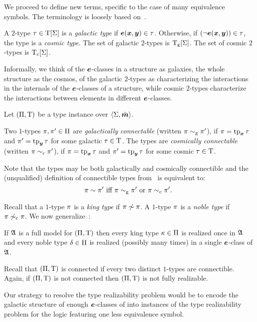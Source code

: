 We proceed to define new terms, specific to the case of many equivalence
symbols.
The terminology is loosely based on~\cite{MALQ:MALQ201400102}.

\begin{definition}
A $2$-type $\tau \in \mathrm{T}[\mathrm{\Sigma}]$ is a \emph{galactic type} if $\bm{e}(\bm{x},\bm{y}) \in
\tau$.
Otherwise, if $(\lnot\bm{e}(\bm{x},\bm{y})) \in \tau$, the type is a \emph{cosmic type}.
The set of galactic $2$-types is $\mathrm{T}_{\mathrm{g}}[\mathrm{\Sigma}]$.
The set of cosmic $2$-types is $\mathrm{T}_{\mathrm{c}}[\mathrm{\Sigma}]$.
\end{definition}
Informally, we think of the $\bm{e}$-classes in a structure as galaxies, the
whole structure as the cosmos, of the galactic $2$-types as characterizing the
interactions in the internals of the $\bm{e}$-classes of a structure, while cosmic $2$-types characterize the interactions between elements in different
$\bm{e}$-classes.

Let $(\Pi,\mathrm{T})$ be a type instance over $\left\langle \mathrm{\Sigma},\bar{\bm{m}} \right\rangle$.
\begin{definition}
Two $1$-types $\pi, {\pi'} \in \Pi$ are \emph{galactically connectable}
(written $\pi \sim_{\mathrm{g}} {\pi'}$), if $\pi = \operatorname{tp}_{\bm{x}}\tau$ and ${\pi'} = \operatorname{tp}_{\bm{y}}\tau$
for some galactic $\tau \in \mathrm{T}$.
The types are \emph{cosmically connectable} (written $\pi \sim_{\mathrm{c}} {\pi'}$), if
$\pi = \operatorname{tp}_{\bm{x}}\tau$ and ${\pi'} = \operatorname{tp}_{\bm{y}}\tau$ for some cosmic $\tau \in \mathrm{T}$.
\end{definition}

Note that the types may be both galactically and cosmically connectible and the
(unqualified) definition of connectible types from~ is
equivalent to:
\[\pi \sim {\pi'} \text{ iff } \pi \sim_{\mathrm{g}} {\pi'} \text{ or } \pi \sim_{\mathrm{c}}
{\pi'}.\]

Recall that a $1$-type $\pi$ is a \emph{king type} if $\pi \not\sim \pi$.
A $1$-type $\pi$ is a \emph{noble type} if $\pi \not\sim_{\mathrm{c}} \pi$.
We now generalize~:
\begin{remark}\label{rem:twovar-noble-once}
If $\mathfrak{A}$ is a full model for $(\Pi,\mathrm{T})$ then every king type
$\kappa \in \Pi$ is realized once in $\mathfrak{A}$ and every noble type $\delta \in
\Pi$ is realized (possibly many times) in a single $\bm{e}$-class of $\mathfrak{A}$.
\end{remark}
Recall that $(\Pi,\mathrm{T})$ is connected if every two distinct $1$-types are
connectible. Again, if $(\Pi,\mathrm{T})$ is not connected then $(\Pi,\mathrm{T})$
is not fully realizable.

Our strategy to resolve the type realizability problem would be to encode the
galactic structure of enough $\bm{e}$-classes of into instances of the type
realizability problem for the logic featuring one less equivalence symbol.

